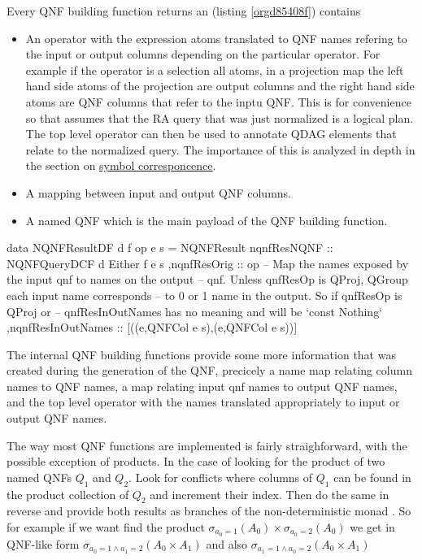 Every QNF building function returns an  (listing
\ref{orgd85408f}) contains

\begin{itemize}
\item An operator with the expression atoms translated to QNF names
  refering to the input or output columns depending on the particular
  operator. For example if the operator is a selection all atoms, in a
  projection map the left hand side atoms of the projection are output
  columns and the right hand side atoms are QNF columns that refer to
  the inptu QNF. This is for convenience so that assumes that the RA
  query that was just normalized is a logical plan. The top level
  operator can then be used to annotate QDAG elements that relate to
  the normalized query. The importance of this is analyzed in depth in
  the section on \hyperref[sec:orgcc899ec]{symbol corresponcence}.
\item A mapping between input and output QNF columns.
\item A  named QNF which is the main payload of the QNF building function.
\end{itemize}

\begin{code}
  \begin{haskellcode}
    data NQNFResultDF d f op e s =
    NQNFResult
    { nqnfResNQNF :: NQNFQueryDCF d Either f e s
      ,nqnfResOrig :: op
      -- Map the names exposed by the input qnf to names on the output
      -- qnf. Unless qnfResOp is QProj, QGroup each input name corresponds
      -- to 0 or 1 name in the output. So if qnfResOp is QProj or
      -- qnfResInOutNames has no meaning and will be `const Nothing`
      ,nqnfResInOutNames :: [((e,QNFCol e s),(e,QNFCol e s))]
    }
  \end{haskellcode}
  \caption{\label{orgd85408f}The internal QNF building functions provide some more information that was created during the generation of the QNF, precicely a name map relating column names to QNF names,  a map relating input qnf names to output QNF names, and the top level operator with the names translated appropriately to input or output QNF names.}
\end{code}

The way most QNF functions are implemented is fairly straighforward,
with the possible exception of products. In the case of looking for
the product of two named QNFs \(Q_1\) and \(Q_2\).  Look for conflicts
where columns of \(Q_1\) can be found in the product collection of
\(Q_2\) and increment their index. Then do the same in reverse and
provide both results as branches of the non-deterministic monad
. So for example if we want find the product
\(\sigma_{a_0=1}(A_0) \times \sigma_{a_0=2}(A_0)\) we get in QNF-like
form \(\sigma_{a_0=1 \land a_1=2} (A_0 \times A_1)\) and also
\(\sigma_{a_1=1 \land a_0=2} (A_0 \times A_1)\)


